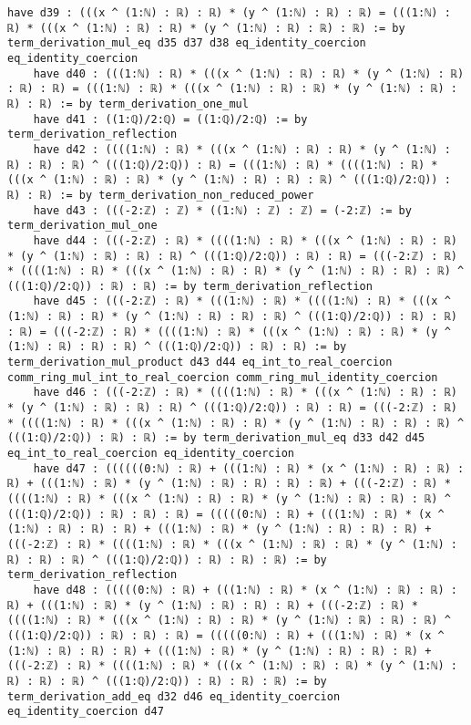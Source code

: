 \documentclass{article}
\begin{document}
\begin{tcolorbox}[colback=white!10, width=\linewidth]
\begin{lstlisting}[language=Lean4]
    have d39 : (((x ^ (1:ℕ) : ℝ) : ℝ) * (y ^ (1:ℕ) : ℝ) : ℝ) = (((1:ℕ) : ℝ) * (((x ^ (1:ℕ) : ℝ) : ℝ) * (y ^ (1:ℕ) : ℝ) : ℝ) : ℝ) := by term_derivation_mul_eq d35 d37 d38 eq_identity_coercion eq_identity_coercion
    have d40 : (((1:ℕ) : ℝ) * (((x ^ (1:ℕ) : ℝ) : ℝ) * (y ^ (1:ℕ) : ℝ) : ℝ) : ℝ) = (((1:ℕ) : ℝ) * (((x ^ (1:ℕ) : ℝ) : ℝ) * (y ^ (1:ℕ) : ℝ) : ℝ) : ℝ) := by term_derivation_one_mul
    have d41 : ((1:ℚ)/2:ℚ) = ((1:ℚ)/2:ℚ) := by term_derivation_reflection
    have d42 : ((((1:ℕ) : ℝ) * (((x ^ (1:ℕ) : ℝ) : ℝ) * (y ^ (1:ℕ) : ℝ) : ℝ) : ℝ) ^ (((1:ℚ)/2:ℚ)) : ℝ) = (((1:ℕ) : ℝ) * ((((1:ℕ) : ℝ) * (((x ^ (1:ℕ) : ℝ) : ℝ) * (y ^ (1:ℕ) : ℝ) : ℝ) : ℝ) ^ (((1:ℚ)/2:ℚ)) : ℝ) : ℝ) := by term_derivation_non_reduced_power
    have d43 : (((-2:ℤ) : ℤ) * ((1:ℕ) : ℤ) : ℤ) = (-2:ℤ) := by term_derivation_mul_one
    have d44 : (((-2:ℤ) : ℝ) * ((((1:ℕ) : ℝ) * (((x ^ (1:ℕ) : ℝ) : ℝ) * (y ^ (1:ℕ) : ℝ) : ℝ) : ℝ) ^ (((1:ℚ)/2:ℚ)) : ℝ) : ℝ) = (((-2:ℤ) : ℝ) * ((((1:ℕ) : ℝ) * (((x ^ (1:ℕ) : ℝ) : ℝ) * (y ^ (1:ℕ) : ℝ) : ℝ) : ℝ) ^ (((1:ℚ)/2:ℚ)) : ℝ) : ℝ) := by term_derivation_reflection
    have d45 : (((-2:ℤ) : ℝ) * (((1:ℕ) : ℝ) * ((((1:ℕ) : ℝ) * (((x ^ (1:ℕ) : ℝ) : ℝ) * (y ^ (1:ℕ) : ℝ) : ℝ) : ℝ) ^ (((1:ℚ)/2:ℚ)) : ℝ) : ℝ) : ℝ) = (((-2:ℤ) : ℝ) * ((((1:ℕ) : ℝ) * (((x ^ (1:ℕ) : ℝ) : ℝ) * (y ^ (1:ℕ) : ℝ) : ℝ) : ℝ) ^ (((1:ℚ)/2:ℚ)) : ℝ) : ℝ) := by term_derivation_mul_product d43 d44 eq_int_to_real_coercion comm_ring_mul_int_to_real_coercion comm_ring_mul_identity_coercion
    have d46 : (((-2:ℤ) : ℝ) * ((((1:ℕ) : ℝ) * (((x ^ (1:ℕ) : ℝ) : ℝ) * (y ^ (1:ℕ) : ℝ) : ℝ) : ℝ) ^ (((1:ℚ)/2:ℚ)) : ℝ) : ℝ) = (((-2:ℤ) : ℝ) * ((((1:ℕ) : ℝ) * (((x ^ (1:ℕ) : ℝ) : ℝ) * (y ^ (1:ℕ) : ℝ) : ℝ) : ℝ) ^ (((1:ℚ)/2:ℚ)) : ℝ) : ℝ) := by term_derivation_mul_eq d33 d42 d45 eq_int_to_real_coercion eq_identity_coercion
    have d47 : ((((((0:ℕ) : ℝ) + (((1:ℕ) : ℝ) * (x ^ (1:ℕ) : ℝ) : ℝ) : ℝ) + (((1:ℕ) : ℝ) * (y ^ (1:ℕ) : ℝ) : ℝ) : ℝ) : ℝ) + (((-2:ℤ) : ℝ) * ((((1:ℕ) : ℝ) * (((x ^ (1:ℕ) : ℝ) : ℝ) * (y ^ (1:ℕ) : ℝ) : ℝ) : ℝ) ^ (((1:ℚ)/2:ℚ)) : ℝ) : ℝ) : ℝ) = (((((0:ℕ) : ℝ) + (((1:ℕ) : ℝ) * (x ^ (1:ℕ) : ℝ) : ℝ) : ℝ) + (((1:ℕ) : ℝ) * (y ^ (1:ℕ) : ℝ) : ℝ) : ℝ) + (((-2:ℤ) : ℝ) * ((((1:ℕ) : ℝ) * (((x ^ (1:ℕ) : ℝ) : ℝ) * (y ^ (1:ℕ) : ℝ) : ℝ) : ℝ) ^ (((1:ℚ)/2:ℚ)) : ℝ) : ℝ) : ℝ) := by term_derivation_reflection
    have d48 : (((((0:ℕ) : ℝ) + (((1:ℕ) : ℝ) * (x ^ (1:ℕ) : ℝ) : ℝ) : ℝ) + (((1:ℕ) : ℝ) * (y ^ (1:ℕ) : ℝ) : ℝ) : ℝ) + (((-2:ℤ) : ℝ) * ((((1:ℕ) : ℝ) * (((x ^ (1:ℕ) : ℝ) : ℝ) * (y ^ (1:ℕ) : ℝ) : ℝ) : ℝ) ^ (((1:ℚ)/2:ℚ)) : ℝ) : ℝ) : ℝ) = (((((0:ℕ) : ℝ) + (((1:ℕ) : ℝ) * (x ^ (1:ℕ) : ℝ) : ℝ) : ℝ) + (((1:ℕ) : ℝ) * (y ^ (1:ℕ) : ℝ) : ℝ) : ℝ) + (((-2:ℤ) : ℝ) * ((((1:ℕ) : ℝ) * (((x ^ (1:ℕ) : ℝ) : ℝ) * (y ^ (1:ℕ) : ℝ) : ℝ) : ℝ) ^ (((1:ℚ)/2:ℚ)) : ℝ) : ℝ) : ℝ) := by term_derivation_add_eq d32 d46 eq_identity_coercion eq_identity_coercion d47

\end{lstlisting}
\end{tcolorbox}
\end{document}
